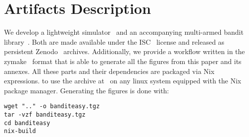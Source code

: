 \documentclass[sigconf]{acmart}
\begin{document}



\clearpage
\section*{Artifacts Description}

We develop a lightweight simulator~\cite{ocst} and an accompanying multi-armed
bandit library~\cite{obandit}. Both are made available under the ISC~\cite{isc}
license and released as persistent Zenodo~\cite{zenodo} archives. Additionally,
we provide a workflow written in the zymake~\cite{breck2008zymake} format that
is able to generate all the figures from this paper and its annexes. All these
parts and their dependencies are packaged via Nix~\cite{nix} expressions.
to use the
archive at~\cite{repro} on any linux system equipped with the Nix package manager.
Generating the figures is done with:

\begin{lstlisting}
wget ".." -o banditeasy.tgz
tar -vzf banditeasy.tgz
cd banditeasy
nix-build
\end{lstlisting}
\end{document}
